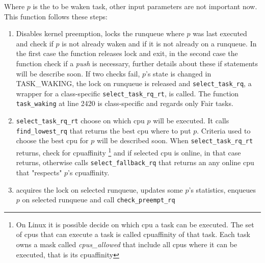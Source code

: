 \lstset{basicstyle=\footnotesize, language=c, captionpos=b, frame=single, label=lis:APIttwu}


Where $p$ is the to be waken task, other input parameters are not important now.
This function follows these steps:

\begin{enumerate}
\item Disables kernel preemption, locks the runqueue where $p$ was last executed and check 
if $p$ is not already waken and if it is not already on a runqueue. In the first case the 
function releases lock and exit, in the second case the function check if a
\textit{push} is necessary, further details about these if statements will be
describe soon. If two checks fail, $p$'s state is changed in TASK\_WAKING, the
lock on runqueue is released and \texttt{select\_task\_rq}, a wrapper for a 
class-specific \texttt{select\_task\_rq\_rt}, is called. The function 
\texttt{task\_waking} at line 2420 is class-specific and regards only Fair tasks.

\lstset{basicstyle=\footnotesize, language=c, captionpos=b, frame=single,label=lis:steps}


\item \texttt{select\_task\_rq\_rt} choose on which cpu $p$ will be executed. It
calls \texttt{find\_lowest\_rq} that returns the best cpu where to put $p$. Criteria
used to choose the best cpu for $p$ will be described soon. When \texttt{select\_task\_rq\_rt} 
returns, check for cpuaffinity \footnote{On Linux it is possible decide on which
cpu a task can be executed. The set of cpus that can execute a task is called 
cpuaffinity of that task. Each task owns a mask called \textit{cpus\_allowed} 
that include all cpus where it can be executed, that is its cpuaffinity} and 
if selected cpu is online, in that case returns, otherwise calls 
\texttt{select\_fallback\_rq} that returns an any online cpu that "respects" 
$p$'s cpuaffinity.

\lstset{basicstyle=\footnotesize, language=c, captionpos=b, frame=single,label=lis:steps}


\item acquires the lock on selected runqueue, updates some $p$'s statistics, enqueues 
$p$ on selected runqueue and call \texttt{check\_preempt\_rq} 

\lstset{basicstyle=\footnotesize, language=c, captionpos=b, frame=single,label=lis:steps}



\end{enumerate}
